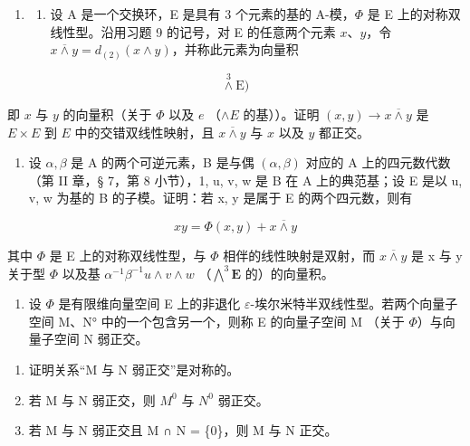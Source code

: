 \begin{enumerate}
\def\labelenumi{\arabic{enumi})}
\setcounter{enumi}{9}
\tightlist
\item
  \begin{enumerate}
  \def\labelenumii{\alph{enumii})}
  \tightlist
  \item
    设 A 是一个交换环，E 是具有 3 个元素的基的 A-模，\(\Phi\) 是 E 上的对称双线性型。沿用习题 9 的记号，对 E 的任意两个元素 \(x\)、\(y\)，令 \(x \overline{\wedge} y = d_{(2)}(x \wedge y)\)，并称此元素为向量积
  \end{enumerate}
\end{enumerate}

\[
\stackrel {{3}} {\wedge} \mathrm{E})
\]

即 \(x\) 与 \(y\) 的向量积（关于 \(\Phi\) 以及 \(e\) （\(\wedge E\) 的基））。证明 \((x, y) \to x \overline{\wedge} y\) 是 \(E \times E\) 到 \(E\) 中的交错双线性映射，且 \(x \overline{\wedge} y\) 与 \(x\) 以及 \(y\) 都正交。

\begin{enumerate}
\def\labelenumi{\alph{enumi})}
\setcounter{enumi}{1}
\tightlist
\item
  设 \(\alpha, \beta\) 是 A 的两个可逆元素，B 是与偶 \((\alpha, \beta)\) 对应的 A 上的四元数代数（第 II 章，§ 7，第 8 小节），1, u, v, w 是 B 在 A 上的典范基；设 E 是以 u, v, w 为基的 B 的子模。证明：若 x, y 是属于 E 的两个四元数，则有
\end{enumerate}

\[
x y = \Phi (x, y) + x \overline {{{{\wedge}}}} y
\]

其中 \(\Phi\) 是 E 上的对称双线性型，与 \(\Phi\) 相伴的线性映射是双射，而 \(x\overline{\wedge}y\) 是 x 与 y 关于型 \(\Phi\) 以及基 \(\alpha^{-1}\beta^{-1}u\wedge v\wedge w\) （\(\bigwedge^{3}\mathbf{E}\) 的）的向量积。

\begin{enumerate}
\def\labelenumi{\arabic{enumi})}
\setcounter{enumi}{10}
\tightlist
\item
  设 \(\Phi\) 是有限维向量空间 E 上的非退化 \(\varepsilon\)-埃尔米特半双线性型。若两个向量子空间 M、N° 中的一个包含另一个，则称 E 的向量子空间 M （关于 \(\Phi\)）与向量子空间 N 弱正交。
\end{enumerate}

\begin{enumerate}
\def\labelenumi{\alph{enumi})}
\item
  证明关系“M 与 N 弱正交”是对称的。
\item
  若 M 与 N 弱正交，则 \(M^{0}\) 与 \(N^{0}\) 弱正交。
\item
  若 M 与 N 弱正交且 M ∩ N = \{0\}，则 M 与 N 正交。
\end{enumerate}

